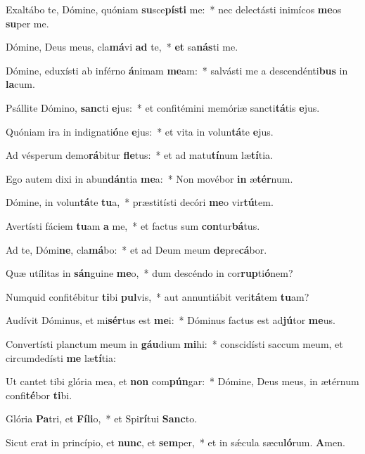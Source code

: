 \item Exaltábo te, Dómine, quóniam \textbf{su}sce\textbf{pís}\textbf{ti} me:~* nec delectásti inimícos \textbf{me}os \textbf{su}per me.
\item Dómine, Deus meus, cla\textbf{má}vi \textbf{ad} te,~* \textbf{et} sa\textbf{nás}ti me.
\item Dómine, eduxísti ab inférno \textbf{á}nimam \textbf{me}am:~* salvásti me a descendénti\textbf{bus} in \textbf{la}cum.
\item Psállite Dómino, \textbf{sanc}ti \textbf{e}jus:~* et confitémini memóriæ sancti\textbf{tá}tis \textbf{e}jus.
\item Quóniam ira in indignati\textbf{ó}ne \textbf{e}jus:~* et vita in volun\textbf{tá}te \textbf{e}jus.
\item Ad vésperum demo\textbf{rá}bitur \textbf{fle}tus:~* et ad matu\textbf{tí}num læ\textbf{tí}tia.
\item Ego autem dixi in abun\textbf{dán}tia \textbf{me}a:~* Non movébor \textbf{in} æ\textbf{tér}num.
\item Dómine, in volun\textbf{tá}te \textbf{tu}a,~* præstitísti decóri \textbf{me}o vir\textbf{tú}tem.
\item Avertísti fáciem \textbf{tu}am \textbf{a} me,~* et factus sum \textbf{con}tur\textbf{bá}tus.
\item Ad te, Dómi\textbf{ne}, cla\textbf{má}bo:~* et ad Deum meum \textbf{de}pre\textbf{cá}bor.
\item Quæ utílitas in \textbf{sán}guine \textbf{me}o,~* dum descéndo in cor\textbf{rup}ti\textbf{ó}nem?
\item Numquid confitébitur \textbf{ti}bi \textbf{pul}vis,~* aut annuntiábit veri\textbf{tá}tem \textbf{tu}am?
\item Audívit Dóminus, et mi\textbf{sér}tus est \textbf{me}i:~* Dóminus factus est ad\textbf{jú}tor \textbf{me}us.
\item Convertísti planctum meum in \textbf{gáu}dium \textbf{mi}hi:~* conscidísti saccum meum, et circumdedísti \textbf{me} læ\textbf{tí}tia:
\item Ut cantet tibi glória mea, et \textbf{non} com\textbf{pún}gar:~* Dómine, Deus meus, in ætérnum confi\textbf{té}bor \textbf{ti}bi.
\item Glória \textbf{Pa}tri, et \textbf{Fí}\textbf{li}o,~* et Spi\textbf{rí}tui \textbf{Sanc}to.
\item Sicut erat in princípio, et \textbf{nunc}, et \textbf{sem}per,~* et in sǽcula sæcu\textbf{ló}rum. \textbf{A}men.